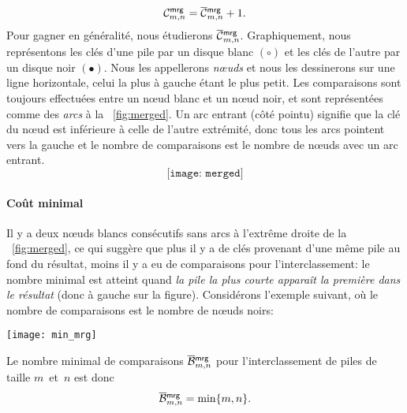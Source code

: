 \begin{equation}
\C{\fun{mrg}}{m,n} = \OC{\fun{mrg}}{m,n} + 1.\label{def:cost_mrg}
\end{equation}
Pour gagner en généralité, nous étudierons
\(\OC{\fun{mrg}}{m,n}\). Graphiquement, nous représentons les clés
d'une pile par un disque blanc \((\circ)\) et les clés de l'autre par
un disque noir \((\bullet)\). Nous les appellerons \emph{n{\oe}uds} et
nous les dessinerons sur une ligne horizontale, celui la plus à gauche
étant le plus petit. Les comparaisons sont toujours effectuées entre
un n{\oe}ud blanc et un n{\oe}ud noir, et sont représentées comme des
\emph{arcs} à la \fig~\vref{fig:merged}.  Un arc entrant (côté pointu)
signifie que la clé du n{\oe}ud est inférieure à celle de l'autre
extrémité, donc tous les arcs pointent vers la gauche et le nombre de
comparaisons est le nombre de n{\oe}uds avec un arc entrant.
\begin{equation}
\texttt{[image: merged]}%
\label{fig:merged}
\end{equation}

\paragraph{Coût minimal}
\label{merge_best_case}

Il y a deux n{\oe}uds blancs consécutifs sans arcs à l'extrême droite
de la \fig~\vref{fig:merged}, ce qui suggère que plus il y a de clés
provenant d'une même pile au fond du résultat, moins il y a eu de
comparaisons pour l'interclassement: le nombre minimal est atteint
quand \emph{la pile la plus courte apparaît la première dans le
  résultat} (donc à gauche sur la figure). Considérons l'exemple
suivant, où le nombre de comparaisons est le nombre de n{\oe}uds
noirs:
\begin{center}
\texttt{[image: min\_mrg]}
\end{center}
Le nombre minimal de comparaisons
\(\OB{\fun{mrg}}{m,n}\) pour
l'interclassement de piles de taille \(m\)~et~\(n\) est donc
\begin{equation}
\OB{\fun{mrg}}{m,n} = \min\{m,n\}.\label{eq:best_merge}
\end{equation}

